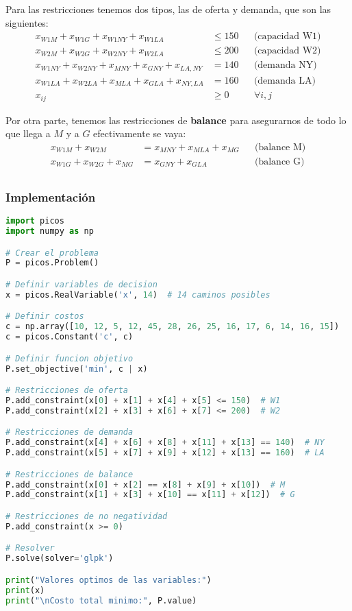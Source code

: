\documentclass[12pt]{article}
\begin{document}
Para las restricciones tenemos dos tipos, las de oferta y demanda, que son las siguientes:
\begin{align*}
x_{W1M} + x_{W1G} + x_{W1NY} + x_{W1LA} &\leq 150 && \text{(capacidad W1)} \\
x_{W2M} + x_{W2G} + x_{W2NY} + x_{W2LA} &\leq 200 && \text{(capacidad W2)} \\
x_{W1NY} + x_{W2NY} + x_{MNY} + x_{GNY} + x_{LA,NY} &= 140 && \text{(demanda NY)} \\
x_{W1LA} + x_{W2LA} + x_{MLA} + x_{GLA} + x_{NY,LA} &= 160 && \text{(demanda LA)} \\
x_{ij} &\geq 0 && \forall i,j
\end{align*}

Por otra parte, tenemos las restricciones de \textbf{balance} para asegurarnos de todo lo que llega a $M$ y a $G$ efectivamente se vaya:
\begin{align*}
x_{W1M} + x_{W2M} &= x_{MNY} + x_{MLA} + x_{MG} && \text{(balance M)} \\
x_{W1G} + x_{W2G} + x_{MG} &= x_{GNY} + x_{GLA} && \text{(balance G)} \\
\end{align*}

\subsubsection{Implementación}

\begin{lstlisting}[language=Python]
import picos
import numpy as np

# Crear el problema
P = picos.Problem()

# Definir variables de decision
x = picos.RealVariable('x', 14)  # 14 caminos posibles

# Definir costos
c = np.array([10, 12, 5, 12, 45, 28, 26, 25, 16, 17, 6, 14, 16, 15])
c = picos.Constant('c', c)

# Definir funcion objetivo
P.set_objective('min', c | x)

# Restricciones de oferta
P.add_constraint(x[0] + x[1] + x[4] + x[5] <= 150)  # W1
P.add_constraint(x[2] + x[3] + x[6] + x[7] <= 200)  # W2

# Restricciones de demanda
P.add_constraint(x[4] + x[6] + x[8] + x[11] + x[13] == 140)  # NY
P.add_constraint(x[5] + x[7] + x[9] + x[12] + x[13] == 160)  # LA

# Restricciones de balance
P.add_constraint(x[0] + x[2] == x[8] + x[9] + x[10])  # M
P.add_constraint(x[1] + x[3] + x[10] == x[11] + x[12])  # G

# Restricciones de no negatividad
P.add_constraint(x >= 0)

# Resolver
P.solve(solver='glpk')

print("Valores optimos de las variables:")
print(x)
print("\nCosto total minimo:", P.value)
\end{lstlisting}
\end{document}
